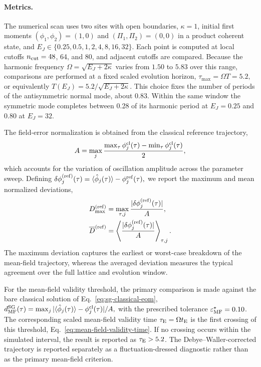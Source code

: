 \documentclass[pra,twocolumn,superscriptaddress,nofootinbib,floatfix]{revtex4-2}
\theoremstyle{remark}
\begin{document}
\paragraph{Metrics.}
The numerical scan uses two sites with open boundaries, \(\kappa=1\), initial first moments \((\phi_1,\phi_2)=(1,0)\) and \((\Pi_1,\Pi_2)=(0,0)\) in a product coherent state, and \(E_J\in\{0.25,0.5,1,2,4,8,16,32\}\). Each point is computed at local cutoffs \(n_{\rm cut}=48\), 64, and 80, and adjacent cutoffs are compared. Because the harmonic frequency
\(\Omega=\sqrt{E_J+2\kappa}\)
varies from \(1.50\) to \(5.83\) over this range, comparisons are performed at a fixed scaled evolution horizon,
\(\tau_{\max}=\Omega T=5.2,\)
or equivalently
\(T(E_J)=5.2/\sqrt{E_J+2\kappa} .\)
This choice fixes the number of periods of the antisymmetric normal mode, about 0.83. Within the same window the symmetric mode completes between 0.28 of its harmonic period at \(E_J=0.25\) and 0.80 at \(E_J=32\).

The field-error normalization is obtained from the classical reference trajectory,
\[
A=\max_j\frac{\max_\tau\phi_j^{\rm cl}(\tau)-\min_\tau\phi_j^{\rm cl}(\tau)}{2},
\]
which accounts for the variation of oscillation amplitude across the parameter sweep. Defining
\(\delta\phi_j^{({\rm ref})}(\tau)=\langle\hat\phi_j(\tau)\rangle-\phi_j^{\rm ref}(\tau),\)
we report the maximum and mean normalized deviations,
\begin{align}
D_{\max}^{({\rm ref})}&=\max_{\tau,j}\frac{|\delta\phi_j^{({\rm ref})}(\tau)|}{A},\nonumber\\
\overline D^{({\rm ref})}&=\left\langle\frac{|\delta\phi_j^{({\rm ref})}(\tau)|}{A}\right\rangle_{\tau,j}.
\label{eq:sg-Dbar}
\end{align}
The maximum deviation captures the earliest or worst-case breakdown of the mean-field trajectory, whereas the averaged deviation measures the typical agreement over the full lattice and evolution window.

For the mean-field validity threshold, the primary comparison is made against the bare classical solution of Eq.~\eqref{eq:sg-classical-eom},
\(d_{\rm MF}^{\rm SG}(\tau)=\max_j|\langle\hat\phi_j(\tau)\rangle-\phi_j^{\rm cl}(\tau)|/A,\)
with the prescribed tolerance \(\varepsilon_{\rm MF}^{\star}=0.10\). The corresponding scaled mean-field validity time \(\tau_{\rm E}=\Omega t_{\rm E}\) is the first crossing of this threshold, Eq.~\eqref{eq:mean-field-validity-time}. If no crossing occurs within the simulated interval, the result is reported as \(\tau_{\rm E}>5.2\). The Debye--Waller-corrected trajectory is reported separately as a fluctuation-dressed diagnostic rather than as the primary mean-field criterion.
\end{document}
